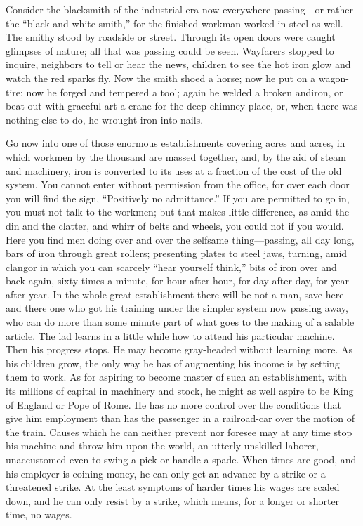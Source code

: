 \documentclass{book}
\begin{document}
Consider the blacksmith of the industrial era now everywhere passing—or rather the “black and white smith,” for the finished workman worked in steel as well. The smithy stood by roadside or street. Through its open doors were caught glimpses of nature; all that was passing could be seen. Wayfarers stopped to inquire, neighbors to tell or hear the news, children to see the hot iron glow and watch the red sparks fly. Now the smith shoed a horse; now he put on a wagon-tire; now he forged and tempered a tool; again he welded a broken andiron, or beat out with graceful art a crane for the deep chimney-place, or, when there was nothing else to do, he wrought iron into nails.

Go now into one of those enormous establishments covering acres and acres, in which workmen by the thousand are massed together, and, by the aid of steam and machinery, iron is converted to its uses at a fraction of the cost of the old system. You cannot enter without permission from the office, for over each door you will find the sign, “Positively no admittance.” If you are permitted to go in, you must not talk to the workmen; but that makes little difference, as amid the din and the clatter, and whirr of belts and wheels, you could not if you would. Here you find men doing over and over the selfsame thing—passing, all day long, bars of iron through great rollers; presenting plates to steel jaws, turning, amid clangor in which you can scarcely “hear yourself think,” bits of iron over and back again, sixty times a minute, for hour after hour, for day after day, for year after year. In the whole great establishment there will be not a man, save here and there one who got his training under the simpler system now passing away, who can do more than some minute part of what goes to the making of a salable article. The lad learns in a little while how to attend his particular machine. Then his progress stops. He may become gray-headed without learning more. As his children grow, the only way he has of augmenting his income is by setting them to work. As for aspiring to become master of such an establishment, with its millions of capital in machinery and stock, he might as well aspire to be King of England or Pope of Rome. He has no more control over the conditions that give him employment than has the passenger in a railroad-car over the motion of the train. Causes which he can neither prevent nor foresee may at any time stop his machine and throw him upon the world, an utterly unskilled laborer, unaccustomed even to swing a pick or handle a spade. When times are good, and his employer is coining money, he can only get an advance by a strike or a threatened strike. At the least symptoms of harder times his wages are scaled down, and he can only resist by a strike, which means, for a longer or shorter time, no wages.
\end{document}
